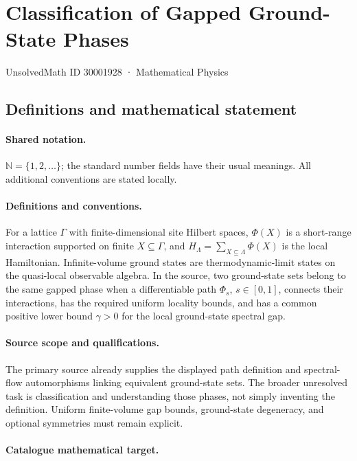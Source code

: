 \documentclass[11pt]{article}
\begin{document}
\setcounter{section}{30001927}
\section{Classification of Gapped Ground-State Phases}\label{30001928}
{\small UnsolvedMath ID 30001928 · Mathematical Physics}
\subsection{Definitions and mathematical statement}

\paragraph{Shared notation.}$\mathbb N=\{1,2,\ldots\}$; the standard number fields have their usual meanings. All additional conventions are stated locally.


\paragraph{Definitions and conventions.} For a lattice $\Gamma$ with finite-dimensional site Hilbert spaces, $\Phi(X)$ is a short-range interaction supported on finite $X\subseteq\Gamma$, and $H_\Lambda=\sum_{X\subseteq\Lambda}\Phi(X)$ is the local Hamiltonian. Infinite-volume ground states are thermodynamic-limit states on the quasi-local observable algebra. In the source, two ground-state sets belong to the same gapped phase when a differentiable path $\Phi_s$, $s\in[0,1]$, connects their interactions, has the required uniform locality bounds, and has a common positive lower bound $\gamma>0$ for the local ground-state spectral gap.

\paragraph{Source scope and qualifications.} The primary source already supplies the displayed path definition and spectral-flow automorphisms linking equivalent ground-state sets. The broader unresolved task is classification and understanding those phases, not simply inventing the definition. Uniform finite-volume gap bounds, ground-state degeneracy, and optional symmetries must remain explicit.

\paragraph{Catalogue mathematical target.}
\end{document}
